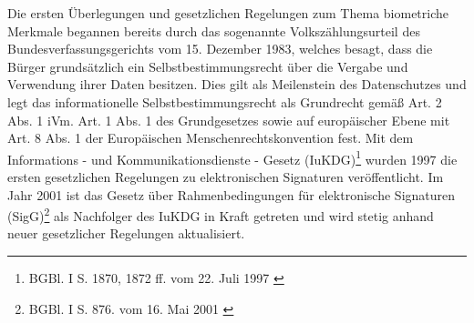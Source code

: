 Die ersten Überlegungen und gesetzlichen Regelungen zum Thema biometriche Merkmale begannen bereits durch
das sogenannte Volkszählungsurteil des Bundesverfassungsgerichts vom 15. Dezember 1983, welches besagt, dass
die Bürger grundsätzlich ein Selbstbestimmungsrecht über die Vergabe und Verwendung ihrer Daten besitzen.
Dies gilt als Meilenstein des Datenschutzes und legt das informationelle Selbstbestimmungsrecht als
Grundrecht gemäß Art. 2 Abs. 1 iVm. Art. 1 Abs. 1 des Grundgesetzes sowie auf europäischer Ebene mit Art. 8
Abs. 1 der Europäischen Menschenrechtskonvention fest. \cite{grundlagen1}\cite{grundlagen2}\cite{grundlagen3} 
Mit dem Informations - und Kommunikationsdienste - Gesetz (IuKDG)\footnote{\label{foot:2} BGBl. I S. 1870,
1872 ff. vom 22. Juli 1997 \cite{grundlagenFN1}} wurden 1997 die ersten gesetzlichen Regelungen zu elektronischen
Signaturen veröffentlicht. Im Jahr 2001 ist das Gesetz über Rahmenbedingungen für elektronische Signaturen
(SigG)\footnote{\label{foot:3} BGBl. I S. 876. vom 16. Mai 2001 \cite{grundlagenFN2}} als Nachfolger des
IuKDG in Kraft getreten und wird stetig anhand neuer gesetzlicher Regelungen aktualisiert. \cite{grundlagen4}